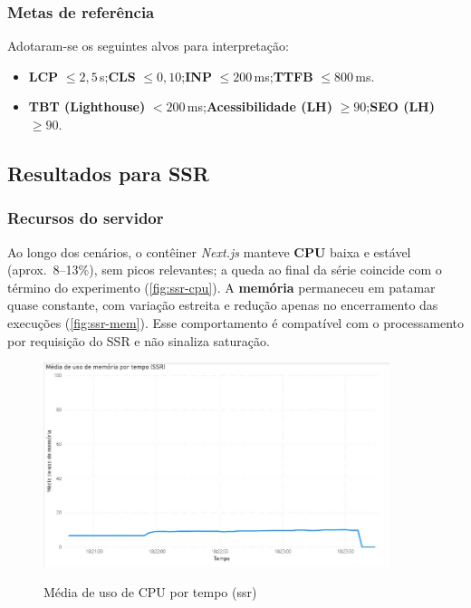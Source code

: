 \subsubsection*{Metas de referência}
Adotaram-se os seguintes alvos para interpretação:
\begin{itemize}
    \item \textbf{LCP} $\leq 2{,}5$\,s;\quad \textbf{CLS} $\leq 0{,}10$;\quad \textbf{INP} $\leq 200$\,ms;\quad \textbf{TTFB} $\leq 800$\,ms.
    \item \textbf{TBT (Lighthouse)} $<200$\,ms;\quad \textbf{Acessibilidade (LH)} $\geq 90$;\quad \textbf{SEO (LH)} $\geq 90$.
\end{itemize}

\subsection{Resultados para SSR}
\label{subsec:resultados-ssr}

\subsubsection*{Recursos do servidor}
Ao longo dos cenários, o contêiner \textit{Next.js} manteve \textbf{CPU} baixa e estável (aprox.\ 8--13\%), sem picos relevantes; a queda ao final da série coincide com o término do experimento (\autoref{fig:ssr-cpu}). A \textbf{memória} permaneceu em patamar quase constante, com variação estreita e redução apenas no encerramento das execuções (\autoref{fig:ssr-mem}). Esse comportamento é compatível com o processamento por requisição do SSR e não sinaliza saturação.

\begin{figure}[H]
    \centering
    \caption{Média de uso de CPU por tempo (\acrshort{ssr})}
    \includegraphics[width=0.9\textwidth]{media/uso_cpu_ssr.jpeg}
    \label{fig:ssr-cpu}
\end{figure}

